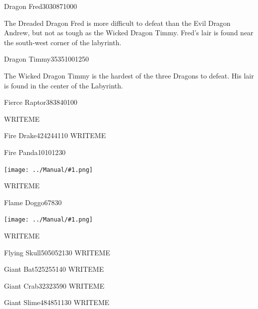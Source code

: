 \documentclass[10pt,twocolumn]{memoir}
\newcommand\pic[1]{%
  \begin{center}
    \texttt{[image: ../Manual/\#1.png]}
  \end{center}}
\begin{document}
\begin{bosspage}{Dragon Fred}{30}{30}{87}{1000}

  The Dreaded  Dragon Fred  is more  difficult to  defeat than  the Evil
  Dragon  Andrew,  but  not  as   tough  as  the  Wicked  Dragon  Timmy.
  Fred's lair is found near the south-west corner of the labyrinth.

\end{bosspage}

\begin{bosspage}{Dragon Timmy}{35}{35}{100}{1250}

  The Wicked Dragon Timmy is the hardest of the three Dragons to defeat.
  His lair is found in the center of the Labyrinth.
  
\end{bosspage}

\begin{monsterpage}{Fierce Raptor}{38}{38}{40}{100}

  WRITEME
\end{monsterpage}

\begin{monsterpage}{Fire Drake}{42}{42}{44}{110}
  WRITEME
\end{monsterpage}

\begin{monsterpage}{Fire Panda}{10}{10}{12}{30}
  \pic{Fire-Panda}
  
  WRITEME
\end{monsterpage}

\begin{monsterpage}{Flame Doggo}{6}{7}{8}{30}
  \pic{Flame-Doggo}
  
  WRITEME
\end{monsterpage}

\begin{monsterpage}{Flying Skull}{50}{50}{52}{130}
  WRITEME
\end{monsterpage}

\begin{monsterpage}{Giant Bat}{52}{52}{55}{140}
  WRITEME
\end{monsterpage}

\begin{monsterpage}{Giant Crab}{32}{32}{35}{90}
  WRITEME
\end{monsterpage}

\begin{monsterpage}{Giant Slime}{48}{48}{51}{130}
  WRITEME
\end{monsterpage}
\end{document}
